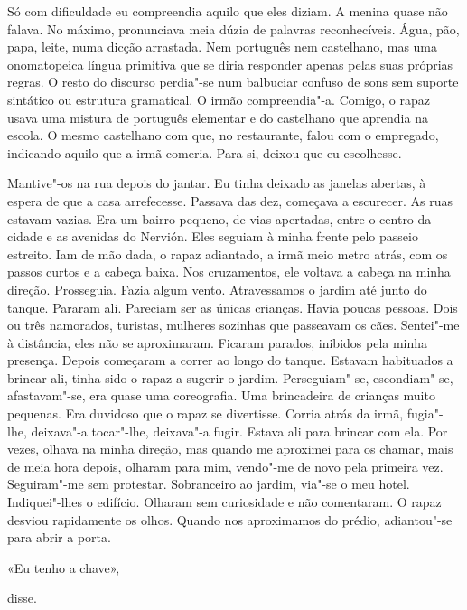 Só com dificuldade eu compreendia aquilo que eles diziam. A menina quase
não falava. No máximo, pronunciava meia dúzia de palavras reconhecíveis.
Água, pão, papa, leite, numa dicção arrastada. Nem português nem
castelhano, mas uma onomatopeica língua primitiva que se diria responder
apenas pelas suas próprias regras. O resto do discurso perdia"-se num
balbuciar confuso de sons sem suporte sintático ou estrutura
gramatical. O irmão compreendia"-a. Comigo, o rapaz usava uma mistura de
português elementar e do castelhano que aprendia na escola. O mesmo
castelhano com que, no restaurante, falou com o empregado, indicando
aquilo que a irmã comeria. Para si, deixou que eu escolhesse.

Mantive"-os na rua depois do jantar. Eu tinha deixado as janelas
abertas, à espera de que a casa arrefecesse. Passava das dez, começava a
escurecer. As ruas estavam vazias. Era um bairro pequeno, de vias
apertadas, entre o centro da cidade e as avenidas do Nervión. Eles
seguiam à minha frente pelo passeio estreito. Iam de mão dada, o rapaz
adiantado, a irmã meio metro atrás, com os passos curtos e a cabeça
baixa. Nos cruzamentos, ele voltava a cabeça na minha direção.
Prosseguia. Fazia algum vento. Atravessamos o jardim até junto do
tanque. Pararam ali. Pareciam ser as únicas crianças. Havia poucas
pessoas. Dois ou três namorados, turistas, mulheres sozinhas que
passeavam os cães. Sentei"-me à distância, eles não se aproximaram.
Ficaram parados, inibidos pela minha presença. Depois começaram a correr
ao longo do tanque. Estavam habituados a brincar ali, tinha sido o rapaz
a sugerir o jardim. Perseguiam"-se, escondiam"-se, afastavam"-se, era
quase uma coreografia. Uma brincadeira de crianças muito pequenas. Era
duvidoso que o rapaz se divertisse. Corria atrás da irmã, fugia"-lhe,
deixava"-a tocar"-lhe, deixava"-a fugir. Estava ali para brincar com
ela. Por vezes, olhava na minha direção, mas quando me aproximei para
os chamar, mais de meia hora depois, olharam para mim, vendo"-me de novo
pela primeira vez. Seguiram"-me sem protestar. Sobranceiro ao jardim,
via"-se o meu hotel. Indiquei"-lhes o edifício. Olharam sem curiosidade
e não comentaram. O rapaz desviou rapidamente os olhos. Quando nos
aproximamos do prédio, adiantou"-se para abrir a porta.

«Eu tenho a chave»,

disse.

